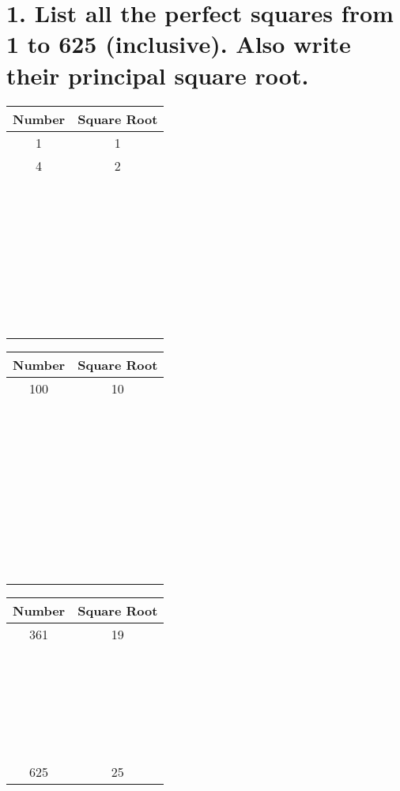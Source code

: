 \documentclass{hw}
\begin{document}
\section*{\normalsize 1. List all the perfect squares from 1 to 625 (inclusive). Also write their principal square root.}
\renewcommand{\arraystretch}{2} %
\begin{minipage}{0.3\textwidth}
    \centering
    \begin{tabular}{|c|c|}
    \hline
    Number & Square Root \\
    \hline
    1 & 1 \\
    \hline
    4 & 2 \\
    \hline
    \, & \, \\
    \hline
    \, & \, \\
    \hline
    \, & \, \\
    \hline
    \, & \, \\
    \hline
    \, & \, \\
    \hline
    \, & \, \\
    \hline
    \, & \, \\
    \hline
    \end{tabular}
\end{minipage}
\begin{minipage}{0.3\textwidth}
    \centering
    \begin{tabular}{|c|c|}
    \hline
    Number & Square Root \\
    \hline
    100 & 10 \\
    \hline
    \, & \, \\
    \hline
    \, & \, \\
    \hline
    \, & \, \\
    \hline
    \, & \, \\
    \hline
    \, & \, \\
    \hline
    \, & \, \\
    \hline
    \, & \, \\
    \hline
    \, & \, \\
    \hline
    \end{tabular}
\end{minipage}
\begin{minipage}{0.3\textwidth}
    \centering
    \begin{tabular}{|c|c|}
    \hline
    Number & Square Root \\
    \hline
    361 & 19 \\
    \hline
    \, & \, \\
    \hline
    \, & \, \\
    \hline
    \, & \, \\
    \hline
    \, & \, \\
    \hline
    \, & \, \\
    \hline
    625 & 25 \\
    \hline
    \end{tabular}
\end{minipage}
\end{document}
